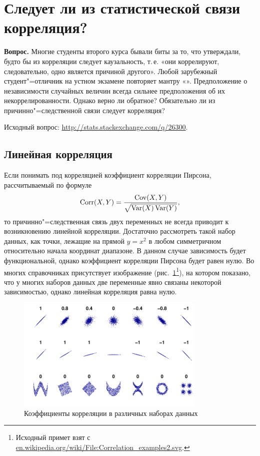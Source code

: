 \documentclass[11pt]{article}
\begin{document}

\section{Следует ли из статистической связи корреляция?}

\textbf{Вопрос.} Многие студенты второго курса бывали биты за то, что утверждали, будто бы из корреляции следует каузальность, т.\,е. «они коррелируют, следовательно, одно является причиной другого». Любой зарубежный студент"=отличник на устном экзамене повторяет мантру «». Предположение о независимости случайных величин всегда сильнее предположения об их некоррелированности. Однако верно ли обратное? Обязательно ли из причинно"=следственной связи следует корреляция?

Исходный вопрос: \url{http://stats.stackexchange.com/q/26300}.


\subsection{Линейная корреляция}

Если понимать под корреляцией коэффициент корреляции Пирсона, рассчитываемый по формуле
\[
\operatorname{Corr}(X,Y) = \frac{\operatorname{Cov}(X,Y)}{\sqrt{\operatorname{Var}(X) \operatorname{Var}(Y)}},
\]
то причинно"=следственная связь двух переменных не всегда приводит к возникновению линейной корреляции. Достаточно рассмотреть такой набор данных, как точки, лежащие на прямой $y = x^2$ в любом симметричном относительно начала координат диапазоне. В данном случае зависимость будет функциональной, однако коэффициент корреляции Пирсона будет равен нулю. Во многих справочниках присутствует изображение (рис.~\ref{fig:corr}\footnote{Исходный примет взят с \url{en.wikipedia.org/wiki/File:Correlation_examples2.svg}.}), на котором показано, что у многих наборов данных две переменные явно связаны некоторой зависимостью, однако линейная корреляция равна нулю.

\begin{figure}[htbp]
	\centering
	\includegraphics[width=9cm]{corr-image.pdf}
	\caption{Коэффициенты корреляции в различных наборах данных} \label{fig:corr}
\end{figure}
\end{document}
